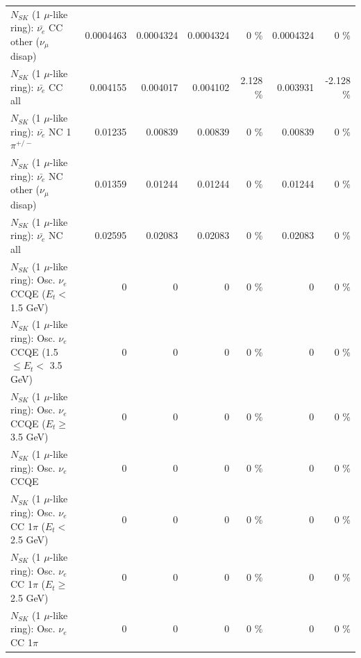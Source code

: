 \begin{table}
\begin{tabular}{| l | r | r | r  r | r  r |}
          $N_{SK}$ (1 $\mu$-like ring): $\bar{\nu_e}$ CC other ($\nu_\mu$ disap) &       0.0004463 &       0.0004324 &       0.0004324 &        0 \%  &       0.0004324 &        0 \%  \\ 
                            $N_{SK}$ (1 $\mu$-like ring): $\bar{\nu_{e}}$ CC all &        0.004155 &        0.004017 &        0.004102 &    2.128 \%  &        0.003931 &   -2.128 \%  \\ 
\hline
                     $N_{SK}$ (1 $\mu$-like ring): $\bar{\nu_e}$ NC 1$\pi^{+/-}$ &         0.01235 &         0.00839 &         0.00839 &        0 \%  &         0.00839 &        0 \%  \\ 
          $N_{SK}$ (1 $\mu$-like ring): $\bar{\nu_e}$ NC other ($\nu_\mu$ disap) &         0.01359 &         0.01244 &         0.01244 &        0 \%  &         0.01244 &        0 \%  \\ 
                            $N_{SK}$ (1 $\mu$-like ring): $\bar{\nu_{e}}$ NC all &         0.02595 &         0.02083 &         0.02083 &        0 \%  &         0.02083 &        0 \%  \\ 
\hline
\hline
\hline
             $N_{SK}$ (1 $\mu$-like ring): Osc. $\nu_e$ CCQE ($E_{t} <$ 1.5 GeV) &               0 &               0 &               0 &        0 \%  &               0 &        0 \%  \\ 
    $N_{SK}$ (1 $\mu$-like ring): Osc. $\nu_e$ CCQE (1.5 $\leq E_{t} <$ 3.5 GeV) &               0 &               0 &               0 &        0 \%  &               0 &        0 \%  \\ 
          $N_{SK}$ (1 $\mu$-like ring): Osc. $\nu_e$ CCQE ($E_{t} \geq$ 3.5 GeV) &               0 &               0 &               0 &        0 \%  &               0 &        0 \%  \\ 
\hline
                                 $N_{SK}$ (1 $\mu$-like ring): Osc. $\nu_e$ CCQE &               0 &               0 &               0 &        0 \%  &               0 &        0 \%  \\ 
\hline
        $N_{SK}$ (1 $\mu$-like ring): Osc. $\nu_e$ CC 1$\pi$ ($E_{t} <$ 2.5 GeV) &               0 &               0 &               0 &        0 \%  &               0 &        0 \%  \\ 
     $N_{SK}$ (1 $\mu$-like ring): Osc. $\nu_e$ CC 1$\pi$ ($E_{t} \geq$ 2.5 GeV) &               0 &               0 &               0 &        0 \%  &               0 &        0 \%  \\ 
\hline
                            $N_{SK}$ (1 $\mu$-like ring): Osc. $\nu_e$ CC 1$\pi$ &               0 &               0 &               0 &        0 \%  &               0 &        0 \%  \\ 

\end{tabular}
\end{table}
